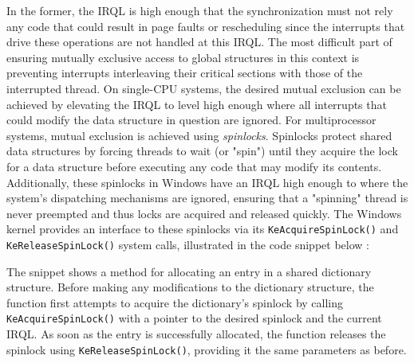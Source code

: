 \documentclass[onecolumn, draftclsnofoot,10pt, compsoc]{IEEEtran}
\begin{document}
In the former, the IRQL is high enough that the synchronization must not rely any code that could result in page faults or rescheduling since the interrupts that drive these operations are not handled at this IRQL. The most difficult part of ensuring mutually exclusive access to global structures in this context is preventing interrupts interleaving their critical sections with those of the interrupted thread. On single-CPU systems, the desired mutual exclusion can be achieved by elevating the IRQL to level high enough where all interrupts that could modify the data structure in question are ignored. For multiprocessor systems, mutual exclusion is achieved using \textit{spinlocks}. Spinlocks protect shared data structures by forcing threads to wait (or "spin") until they acquire the lock for a data structure before executing any code that may modify its contents. Additionally, these spinlocks in Windows have an IRQL high enough to where the system's dispatching mechanisms are ignored, ensuring that a "spinning" thread is never preempted and thus locks are acquired and released quickly. The Windows kernel provides an interface to these spinlocks via its \verb`KeAcquireSpinLock()` and \verb`KeReleaseSpinLock()` system calls, illustrated in the code snippet below \cite{dictlib}:

The snippet shows a method for allocating an entry in a shared dictionary structure. Before making any modifications to the dictionary structure, the function first attempts to acquire the dictionary's spinlock by calling \verb`KeAcquireSpinLock()` with a pointer to the desired spinlock and the current IRQL. As soon as the entry is successfully allocated, the function releases the spinlock using \verb`KeReleaseSpinLock()`, providing it the same parameters as before.
\end{document}

